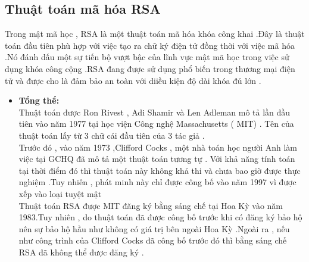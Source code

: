 \documentclass[paper=a4, fontsize=11pt]{scrartcl}	%
\numberwithin{equation}{section}															%
\numberwithin{figure}{section}																%
\numberwithin{table}{section}																%
\begin{document}
\subsection{Thuật toán mã hóa RSA}
Trong mật mã học , RSA là một thuật toán mã hóa khóa công khai .Đây là thuật toán đầu tiên phù hợp với việc tạo ra chữ ký điện tử đồng thời với việc mã hóa .Nó đánh dấu một sự tiến bộ vượt bậc của lĩnh vực mật mã học trong việc sử dụng khóa công cộng .RSA đang được sử dụng phổ biến trong thương mại điện tử và được cho là đảm bảo an toàn với diiều kiện độ dài khóa đủ lớn .
\begin{itemize}
    \item \textbf{Tổng thể:}\\[0.1cm]


Thuật toán được Ron Rivest , Adi Shamir và Len Adleman mô tả lần đầu tiên vào năm 1977 tại học viện Công nghệ  Massachusetts ( MIT) . Tên của thuật toán lấy từ 3 chữ cái đầu tiên của 3 tác giả .\\
	
	
Trước đó , vào năm 1973 ,Clifford Cocks , một nhà toán học người Anh làm việc tại GCHQ đã mô tả một thuật toán tương tự . Với khả năng tính toán tại thời điểm đó thì thuật toán này không khả thi và chưa bao giờ được thực nghiệm .Tuy nhiên , phát minh này chỉ được công bố vào năm 1997 vì được xếp vào loại tuyệt mật \\


Thuật toán RSA được MIT đăng ký bằng sáng chế tại Hoa Kỳ vào năm 1983.Tuy nhiên , do thuật toán đã được công bố trước khi có đăng ký bảo hộ nên sự bảo hộ hầu như không có giá trị bên ngoài Hoa Kỳ .Ngoài ra , nếu như công trình của Clifford Cocks đã công bố trước đó thì bằng sáng chế RSA đã không thể được đăng ký .
\\
\end{itemize}
\end{document}
